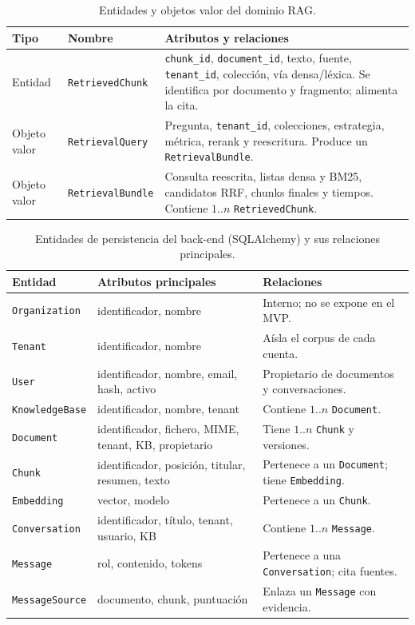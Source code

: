 \begin{table}[htbp]
\centering
\caption{Entidades y objetos valor del dominio RAG.}
\label{tab:entidades-dominio}
\small
\begin{tabular}{@{}llp{7.4cm}@{}}
\toprule
\textbf{Tipo} & \textbf{Nombre} & \textbf{Atributos y relaciones} \\
\midrule
Entidad & \texttt{RetrievedChunk} & \texttt{chunk\_id}, \texttt{document\_id}, texto, fuente, \texttt{tenant\_id}, colección, vía densa/léxica. Se identifica por documento y fragmento; alimenta la cita. \\
Objeto valor & \texttt{RetrievalQuery} & Pregunta, \texttt{tenant\_id}, colecciones, estrategia, métrica, rerank y reescritura. Produce un \texttt{RetrievalBundle}. \\
Objeto valor & \texttt{RetrievalBundle} & Consulta reescrita, listas densa y BM25, candidatos RRF, chunks finales y tiempos. Contiene $1..n$ \texttt{RetrievedChunk}. \\
\bottomrule
\end{tabular}
\end{table}

\begin{table}[htbp]
\centering
\caption{Entidades de persistencia del back-end (SQLAlchemy) y sus relaciones principales.}
\label{tab:entidades-persistencia}
\small
\begin{tabular}{@{}llp{6.8cm}@{}}
\toprule
\textbf{Entidad} & \textbf{Atributos principales} & \textbf{Relaciones} \\
\midrule
\texttt{Organization} & identificador, nombre & Interno; no se expone en el MVP. \\
\texttt{Tenant} & identificador, nombre & Aísla el corpus de cada cuenta. \\
\texttt{User} & identificador, nombre, email, hash, activo & Propietario de documentos y conversaciones. \\
\texttt{KnowledgeBase} & identificador, nombre, tenant & Contiene $1..n$ \texttt{Document}. \\
\texttt{Document} & identificador, fichero, MIME, tenant, KB, propietario & Tiene $1..n$ \texttt{Chunk} y versiones. \\
\texttt{Chunk} & identificador, posición, titular, resumen, texto & Pertenece a un \texttt{Document}; tiene \texttt{Embedding}. \\
\texttt{Embedding} & vector, modelo & Pertenece a un \texttt{Chunk}. \\
\texttt{Conversation} & identificador, título, tenant, usuario, KB & Contiene $1..n$ \texttt{Message}. \\
\texttt{Message} & rol, contenido, tokens & Pertenece a una \texttt{Conversation}; cita fuentes. \\
\texttt{MessageSource} & documento, chunk, puntuación & Enlaza un \texttt{Message} con evidencia. \\
\bottomrule
\end{tabular}
\end{table}

